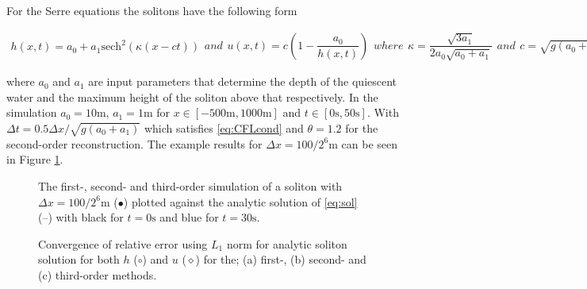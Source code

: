 \documentclass[SingleSpace,12pt,Proceedings]{Serre_ASCE}
\begin{document}
For the Serre equations the solitons have the following form
\begin{linenomath}
\begin{subequations}
\begin{gather}
h\left(x,t\right) = a_0 + a_1\text{sech}^2\left( \kappa\left(x - ct\right)\right)
\end{gather}
and
\begin{gather}
u\left(x,t\right) = c\left(1 - \dfrac{a_0}{h(x,t)} \right)
\end{gather}
where
\begin{gather}
\kappa = \dfrac{\sqrt{3a_1}}{2a_0 \sqrt{ a_0 + a_1}}
\end{gather}
and
\begin{gather}
c = \sqrt{g \left(a_0 + a_1\right)}
\end{gather}
\label{eq:sol}
\end{subequations}
\end{linenomath}
where $a_0$ and $a_1$ are input parameters that determine the depth of the quiescent water and the maximum height of the soliton above that respectively. In the simulation $a_0 = 10\text{m}$, $a_1 = 1\text{m}$ for $x\in\left[-500\text{m},1000\text{m}\right]$ and $t\in\left[0\text{s},50\text{s}\right]$. With $\Delta t = 0.5 \Delta x / \sqrt{g (a_0 + a_1)}$ which satisfies \eqref{eq:CFLcond} and $\theta = 1.2$ for the second-order reconstruction. The example results for $\Delta x = 100 /2^{6}\text{m}$ can be seen in Figure \ref{fig:solitone}.

\subfiglabelskip=0pt
\begin{figure}
\centering
{}
\caption{The first-, second- and third-order simulation of a soliton with $\Delta x = 100 /2^{6}\text{m}$ ($\bullet$) plotted against the analytic solution of \eqref{eq:sol} (\---) with black for $t =0\text{s}$ and blue for $t=30\text{s}$.}
\label{fig:solitone}
\end{figure}
\begin{figure}
\centering
{}
\caption{Convergence of relative error using $L_1$ norm for analytic soliton solution for both $h$ ($\circ$) and $u$ ($\diamond$) for the; (a) first-, (b) second- and (c) third-order methods.}
\label{fig:solitoncon}
\end{figure} 
\end{document}
